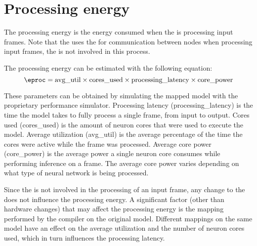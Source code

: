 \section{Processing energy}
The processing energy is the energy consumed when the \graicore{} is processing input frames.
Note that the \graicore{} uses the \eventnoc{} for communication between nodes when processing input frames, the \confignoc{} is not involved in this process.

The processing energy can be estimated with the following equation:
\begin{equation}
    \eproc = \textrm{avg\_util} \times \textrm{cores\_used} \times \textrm{processing\_latency} \times \textrm{core\_power}
\end{equation}

These parameters can be obtained by simulating the mapped model with the proprietary performance simulator.
Processing latency (\textrm{processing\_latency}) is the time the model takes to fully process a single frame, from input to output.
Cores used (\textrm{cores\_used}) is the amount of neuron cores that were used to execute the model.
Average utilization (\textrm{avg\_util}) is the average percentage of the time the cores were active while the frame was processed. 
Average core power (\textrm{core\_power}) is the average power a single neuron core consumes while performing inference on a frame.
The average core power varies depending on what type of neural network is being processed.

Since the \confignoc{} is not involved in the processing of an input frame, any change to the \confignoc{} does not influence the processing energy.
A significant factor (other than hardware changes) that may affect the processing energy is the mapping performed by the compiler on the original model. 
Different mappings on the same model have an effect on the average utilization and the number of neuron cores used, which in turn influences the processing latency.
